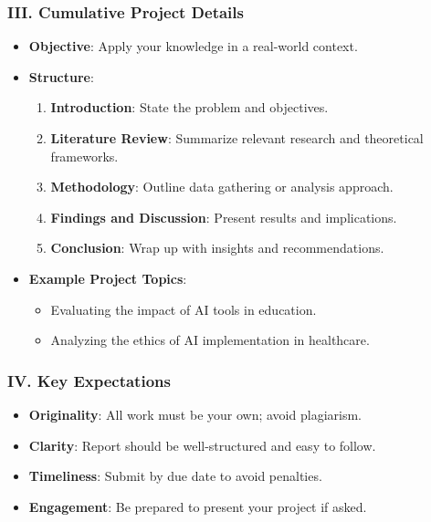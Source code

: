 \documentclass{beamer}
\begin{document}
\begin{frame}[fragile]
    \frametitle{III. Cumulative Project Details}
    \begin{itemize}
        \item \textbf{Objective}: Apply your knowledge in a real-world context.
        \item \textbf{Structure}:
        \begin{enumerate}
            \item \textbf{Introduction}: State the problem and objectives.
            \item \textbf{Literature Review}: Summarize relevant research and theoretical frameworks.
            \item \textbf{Methodology}: Outline data gathering or analysis approach.
            \item \textbf{Findings and Discussion}: Present results and implications.
            \item \textbf{Conclusion}: Wrap up with insights and recommendations.
        \end{enumerate}
        \item \textbf{Example Project Topics}:
        \begin{itemize}
            \item Evaluating the impact of AI tools in education.
            \item Analyzing the ethics of AI implementation in healthcare.
        \end{itemize}
    \end{itemize}
\end{frame}

\begin{frame}[fragile]
    \frametitle{IV. Key Expectations}
    \begin{itemize}
        \item \textbf{Originality}: All work must be your own; avoid plagiarism.
        \item \textbf{Clarity}: Report should be well-structured and easy to follow.
        \item \textbf{Timeliness}: Submit by due date to avoid penalties.
        \item \textbf{Engagement}: Be prepared to present your project if asked.
    \end{itemize}
\end{frame}
\end{document}
